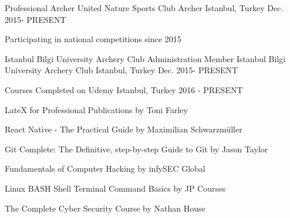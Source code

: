 \begin{cventries}

\cventry
{Professional Archer} %
{United Nature Sports Club Archer} %
{Istanbul, Turkey} %
{Dec. 2015- PRESENT} %
{ %
\begin{cvitems}
\item {Participating in national competitions since 2015}
\end{cvitems}
}


\cventry
{Istanbul Bilgi University Archery Club Administration Member} %
{Istanbul Bilgi University Archery Club} %
{Istanbul, Turkey} %
{Dec. 2015- PRESENT} %
{}%




\cventry
{} %
{Courses Completed on Udemy} %
{Istanbul, Turkey} %
{2016 - PRESENT} %
{ %
\begin{cvitems}
\item {LateX for Professional Publications by Toni Farley}
\item {React Native - The Practical Guide by Maximilian Schwarzmüller}
\item {Git Complete: The Definitive, step-by-step Guide to Git by Jason Taylor}
\item {Fundamentals of Computer Hacking by infySEC Global}
\item {Linux BASH Shell Terminal Command Basics by JP Courses}
\item {The Complete Cyber Security Course by Nathan House}
\end{cvitems}
}


\end{cventries}